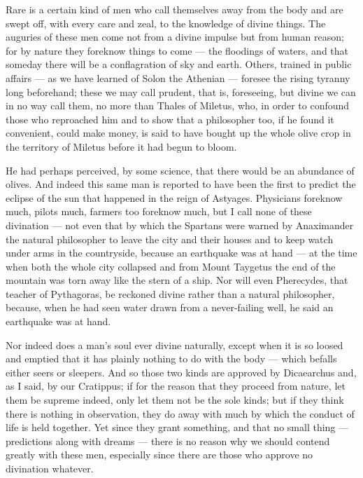  Rare is a certain kind of men who call themselves away from the body and are swept off, with every care and zeal, to the knowledge of divine things. The auguries of these men come not from a divine impulse but from human reason; for by nature they foreknow things to come — the floodings of waters, and that someday there will be a conflagration of sky and earth. Others, trained in public affairs — as we have learned of Solon the Athenian — foresee the rising tyranny long beforehand; these we may call prudent, that is, foreseeing, but divine we can in no way call them, no more than Thales of Miletus, who, in order to confound those who reproached him and to show that a philosopher too, if he found it convenient, could make money, is said to have bought up the whole olive crop in the territory of Miletus before it had begun to bloom.

 He had perhaps perceived, by some science, that there would be an abundance of olives. And indeed this same man is reported to have been the first to predict the eclipse of the sun that happened in the reign of Astyages. Physicians foreknow much, pilots much, farmers too foreknow much, but I call none of these divination — not even that by which the Spartans were warned by Anaximander the natural philosopher to leave the city and their houses and to keep watch under arms in the countryside, because an earthquake was at hand — at the time when both the whole city collapsed and from Mount Taygetus the end of the mountain was torn away like the stern of a ship. Nor will even Pherecydes, that teacher of Pythagoras, be reckoned divine rather than a natural philosopher, because, when he had seen water drawn from a never-failing well, he said an earthquake was at hand.

 Nor indeed does a man's soul ever divine naturally, except when it is so loosed and emptied that it has plainly nothing to do with the body — which befalls either seers or sleepers. And so those two kinds are approved by Dicaearchus and, as I said, by our Cratippus; if for the reason that they proceed from nature, let them be supreme indeed, only let them not be the sole kinds; but if they think there is nothing in observation, they do away with much by which the conduct of life is held together. Yet since they grant something, and that no small thing — predictions along with dreams — there is no reason why we should contend greatly with these men, especially since there are those who approve no divination whatever.

